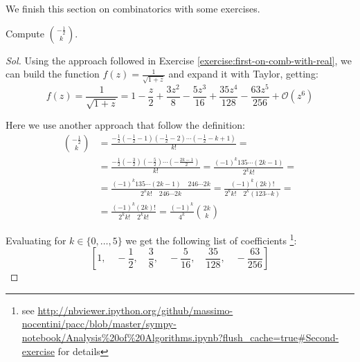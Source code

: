 We finish this section on combinatorics with some exercises.
\begin{exercise}
  Compute ${{ -\frac{1}{2} }\choose{k}} $.
\end{exercise}
\begin{proof}[Sol]
  Using the approach followed in Exercise
  \autoref{exercise:first-on-comb-with-real}, we can build the
  function $f(z) = \frac{1}{\sqrt{1+z}} $ and expand it with Taylor, getting:
  $$ f(z) = \frac{1}{\sqrt{1+z}}  = 1 - \frac{z}{2} + \frac{3 z^{2}}{8} - \frac{5 z^{3}}{16} + \frac{35 z^{4}}{128} - \frac{63 z^{5}}{256} + \mathcal{O}\left(z^{6}\right) $$

  Here we use another approach that follow the definition:
  \begin{displaymath}
    \begin{split}
      {{- \frac{1}{2} }\choose{k}} &= \frac{- \frac{1}{2}(- \frac{1}{2}
        -1)(- \frac{1}{2}-2)\cdots(- \frac{1}{2}-k +1) }{k!} = \\
      &= \frac{- \frac{1}{2}(- \frac{3}{2})(- \frac{5}{2})\cdots(-
        \frac{2k-1}{2}) }{k!} =
      \frac{(-1)^k 1 3 5\cdots (2k-1) }{2^k k!} =\\
      &=\frac{(-1)^k 1 3 5\cdots (2k-1) \quad 2 4 6\cdots 2k } {2^k
        k!\quad 2 4 6\cdots 2k } = \frac{(-1)^k (2k)! }
      {2^k k!\quad 2^k(1 2 3 \cdots k) } =\\
      &= \frac{(-1)^k (2k)! } {2^k k!\quad 2^kk! } =\frac{(-1)^k}{4^k }
      {{2k}\choose{k}}
    \end{split}
  \end{displaymath}

  Evaluating for $k \in \{0, \ldots, 5\}$ we get the following list of coefficients
  \footnote{see \url{http://nbviewer.ipython.org/github/massimo-nocentini/pacc/blob/master/sympy-notebook/Analysis\%20of\%20Algorithms.ipynb?flush_cache=true\#Second-exercise} for details}:
  $$\left [ 1, \quad - \frac{1}{2}, \quad \frac{3}{8}, \quad - \frac{5}{16}, \quad \frac{35}{128}, \quad - \frac{63}{256}\right ]$$

\end{proof}

